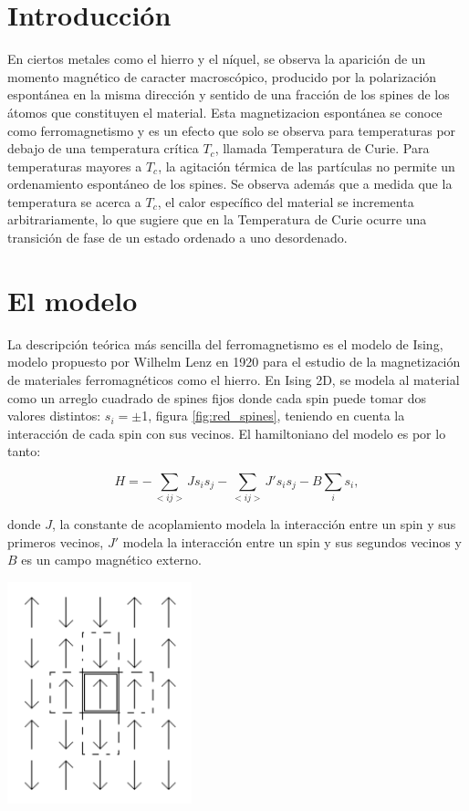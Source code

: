 \documentclass[%
 reprint,
 amsmath,amssymb,
 aps,
spanish]{revtex4-1}
\begin{document}
\section{Introducción}
En ciertos metales como el hierro y el níquel, se observa la aparición de un momento magnético de caracter macroscópico, producido por la polarización espontánea en la misma dirección y sentido de 
una fracción 
de los spines de los átomos que constituyen el material. Esta magnetizacion espontánea se conoce como ferromagnetismo y es un efecto que solo se observa para temperaturas por 
debajo de 
una temperatura crítica $T_c$, llamada Temperatura de Curie. Para temperaturas mayores a $T_c$, la agitación térmica de las partículas
no permite un ordenamiento espontáneo de los spines. Se observa además que a medida que la temperatura se acerca a $T_c$, el calor específico del material se incrementa arbitrariamente, lo que 
sugiere que en la Temperatura de Curie ocurre una transición de fase de un estado ordenado a uno desordenado.\cite{huang}

\section{El modelo}
La descripción teórica más sencilla del ferromagnetismo es el modelo de Ising, modelo propuesto por Wilhelm Lenz en 1920 para el estudio de la magnetización de materiales ferromagnéticos 
como el hierro. En Ising 2D, se modela al material como un arreglo cuadrado de spines fijos donde cada spin puede tomar dos valores distintos: $s_i= \pm$1, figura \ref{fig:red_spines}, teniendo en 
cuenta la interacción de cada spin con sus vecinos. El hamiltoniano del modelo es por lo tanto:

\begin{equation}
H=-\sum_{<ij>}{Js_is_j}-\sum_{<ij>}{J's_is_j}-B\sum_{i}{s_i},
\label{hamiltoniano}
\end{equation}

donde $J$, la constante de acoplamiento modela la interacción entre un spin y sus primeros vecinos, $J'$ modela la interacción entre un spin y sus segundos vecinos y $B$ es un campo magnético 
externo. 

\begin{minipage}{0.45\textwidth}									
\centering
\includegraphics[width=0.4\textwidth]{imagenes/red_spines}
\label{fig:red_spines}
\end{minipage}
\end{document}
